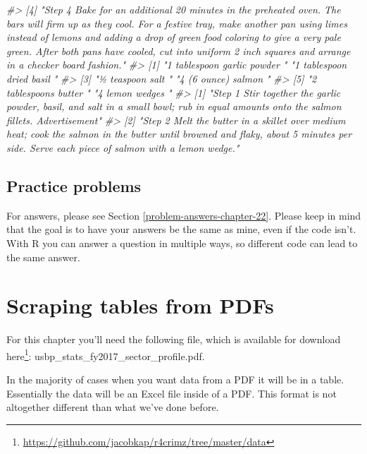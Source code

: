 \documentclass[
]{krantz}
\makeatletter
\newenvironment{Shaded}{\begin{snugshade}}{\end{snugshade}}
\newcommand{\CommentTok}[1]{\textcolor[rgb]{0.37,0.37,0.37}{\textit{#1}}}
\renewcommand{\href}[2]{#2\footnote{\url{#1}}}
\newenvironment{kframe}{%
\medskip{}
\setlength{\fboxsep}{.8em}
 \def\at@end@of@kframe{}%
 \ifinner\ifhmode%
  \def\at@end@of@kframe{\end{minipage}}%
  \begin{minipage}{\columnwidth}%
 \fi\fi%
 \def\FrameCommand##1{\hskip\@totalleftmargin \hskip-\fboxsep
 \colorbox{shadecolor}{##1}\hskip-\fboxsep
     \hskip-\linewidth \hskip-\@totalleftmargin \hskip\columnwidth}%
 \MakeFramed {\advance\hsize-\width
   \@totalleftmargin\z@ \linewidth\hsize
   \@setminipage}}%
 {\par\unskip\endMakeFramed%
 \at@end@of@kframe}
\renewenvironment{Shaded}{\begin{kframe}}{\end{kframe}}
\makeatother
\begin{document}
\begin{Shaded}
\begin{Highlighting}[]
\CommentTok{\#\textgreater{} [4] "Step 4   Bake for an additional 20 minutes in the preheated oven. The bars will firm up as they cool. For a festive tray, make another pan using limes instead of lemons and adding a drop of green food coloring to give a very pale green. After both pans have cooled, cut into uniform 2 inch squares and arrange in a checker board fashion."}
\CommentTok{\#\textgreater{} [1] "1 tablespoon garlic powder " "1 tablespoon dried basil "  }
\CommentTok{\#\textgreater{} [3] "½ teaspoon salt "            "4 (6 ounce) salmon "        }
\CommentTok{\#\textgreater{} [5] "2 tablespoons butter "       "4 lemon wedges "            }
\CommentTok{\#\textgreater{} [1] "Step 1   Stir together the garlic powder, basil, and salt in a small bowl; rub in equal amounts onto the salmon fillets.    Advertisement"                                              }
\CommentTok{\#\textgreater{} [2] "Step 2   Melt the butter in a skillet over medium heat; cook the salmon in the butter until browned and flaky, about 5 minutes per side. Serve each piece of salmon with a lemon wedge."}
\end{Highlighting}
\end{Shaded}

\hypertarget{practice-problems-15}{%
\section{Practice problems}\label{practice-problems-15}}

For answers, please see Section \ref{problem-answers-chapter-22}. Please keep in mind that the goal is to have your answers be the same as mine, even if the code isn't. With R you can answer a question in multiple ways, so different code can lead to the same answer.

\hypertarget{scrape-table}{%
\chapter{Scraping tables from PDFs}\label{scrape-table}}

For this chapter you'll need the following file, which is available for download \href{https://github.com/jacobkap/r4crimz/tree/master/data}{here}: usbp\_stats\_fy2017\_sector\_profile.pdf.

In the majority of cases when you want data from a PDF it will be in a table. Essentially the data will be an Excel file inside of a PDF. This format is not altogether different than what we've done before.
\end{document}
